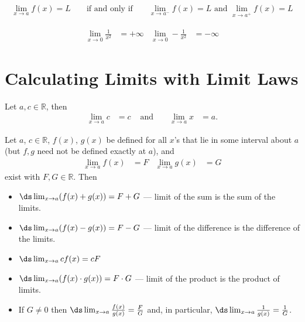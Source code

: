 \begin{theorem}\label{thm_1_3_1}
\begin{align*}
\lim_{x \to a} f(x) = L && \mbox{ if and only if } && \lim_{x \to a^-} f(x) = L \mbox{ and } \lim_{x \to a^+} f(x) = L
\end{align*}
\end{theorem}
\begin{align*}
\lim_{x \to 0} \frac{1}{x^2} &= +\infty & \lim_{x \to 0} -\frac{1}{x^2} &= -\infty
\end{align*}
\section{Calculating Limits with Limit Laws}\label{sec_1_4}
\begin{theorem}\label{thm_easy_lim}
Let $a, c\in\mathbb{R}$, then
\begin{align*}
\lim_{x \to a} c & = c & \text{ and }&& \lim_{x \to a} x &= a.
\end{align*}
\end{theorem}
\begin{theorem}
Let $a$, $c\in\mathbb{R}$, $f(x)$, $g(x)$ be defined for all $x$'s that lie in some interval about $a$ (but $f,g$ need not be defined exactly at $a$), and
\begin{align*}
\lim_{x \to a} f(x)&=F & \lim_{x \to a} g(x) &=G
\end{align*}
exist with $F,G \in \mathbb{R}$. Then
\begin{itemize}
\item $\ds \lim_{x \to a} (f(x) + g(x)) = F + G$ --- limit of the sum is the sum of the limits.
\item $\ds \lim_{x \to a} (f(x) - g(x)) = F - G$ --- limit of the difference is the difference of the limits.
\item $\ds \lim_{x \to a} c f(x) = c F$
\item $\ds \lim_{x \to a} ( f(x) \cdot g(x) ) = F \cdot G$ --- limit of the product is the product of limits.
\item If $G \neq 0$ then $\ds \lim_{x \to a} \frac{f(x)}{g(x)} = \frac{F}{G}$ and, in particular, $\ds \lim_{x\rightarrow a}\frac{1}{g(x)}=\frac{1}{G}$.
\end{itemize}
\end{theorem}
